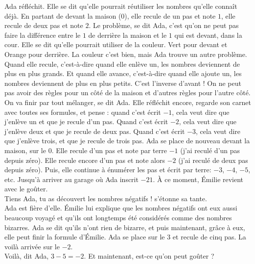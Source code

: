 Ada réfléchit. 
Elle se dit qu’elle pourrait réutiliser les nombres qu’elle connaît déjà. En partant de devant la maison ($0$), elle recule de un pas et note $1$, elle recule de deux pas et note $2$. 
Le problème, se dit Ada, c’est qu’on ne peut pas faire la différence entre le $1$ de derrière la maison et le $1$ qui est devant, dans la cour. 
Elle se dit qu’elle pourrait utiliser de la couleur. 
Vert pour devant et Orange pour derrière. 
La couleur c’est bien, mais Ada trouve un autre problème. 
Quand elle recule, c'est-à-dire quand elle enlève un, les nombres deviennent de plus en plus grands. Et quand elle avance, c’est-à-dire quand elle ajoute un, les nombres deviennent de plus en plus petits.
C’est l’inverse d’avant ! On ne peut pas avoir des règles pour un côté de la maison et d’autres règles pour l’autre côté. 
On va finir par tout mélanger, se dit Ada. 
Elle réfléchit encore, regarde son carnet avec toutes ses formules, et pense : quand c’est écrit $-1$, cela veut dire que j’enlève un et que je recule d’un pas. Quand c’est écrit $-2$, cela veut dire que j’enlève deux et que je recule de deux pas. Quand c’est écrit $-3$, cela veut dire que j’enlève trois, et que je recule de trois pas. 
Ada se place de nouveau devant la maison, sur le $0$. Elle recule d’un pas et note par terre $-1$ (j’ai reculé d’un pas depuis zéro). Elle recule encore d’un pas et note alors $-2$ (j’ai reculé de deux pas depuis zéro). Puis, elle continue à énumérer les pas et écrit par terre: $-3$, $-4$, $-5$, etc. 
Jusqu'à arriver au garage où Ada inscrit $-21$. 
À ce moment, Émilie revient avec le goûter.\\
\guillemotleft Tiens Ada, tu as découvert les nombres négatifs ! s’étonne sa tante. \guillemotright\\
Ada est fière d’elle. Émilie lui explique que les nombres négatifs ont eux aussi beaucoup voyagé et qu’ils ont longtemps été considérés comme des nombres bizarres. Ada se dit qu’ils n’ont rien de bizarre, et puis maintenant, grâce à eux, elle peut finir la formule d’Émilie. Ada se place sur le $3$ et recule de cinq pas. La voilà arrivée sur le $-2$.\\
\guillemotleft Voilà, dit Ada, $3 - 5 = -2$. Et maintenant, est-ce qu’on peut goûter ? \guillemotright

%    
